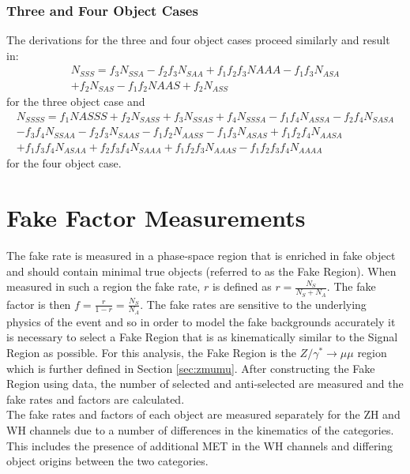 \subsubsection{Three and Four Object Cases}\label{sec:34_obj}
The derivations for the three and four object cases proceed similarly and result in:
\begin{multline*}
    N_{SSS}=f_3N_{SSA}-f_2f_3N_{SAA}+f_1f_2f_3N{AAA}-f_1f_3N_{ASA}\\
    +f_2N_{SAS}-f_1f_2N{AAS}+f_2N_{ASS}
\end{multline*}
\noindent for the three object case and 
\begin{multline*}
    N_{SSSS}=f_1N{ASSS}+f_2N_{SASS}+f_3N_{SSAS}+f_4N_{SSSA}-f_1f_4N_{ASSA}-f_2f_4N_{SASA}\\
    -f_3f_4N_{SSAA}-f_2f_3N_{SAAS}-f_1f_2N_{AASS}-f_1f_3N_{ASAS}+f_1f_2f_4N_{AASA}\\
    +f_1f_3f_4N_{ASAA}+f_2f_3f_4N_{SAAA}+f_1f_2f_3N_{AAAS}-f_1f_2f_3f_4N_{AAAA}
\end{multline*}
\noindent for the four object case.

\section{Fake Factor Measurements}\label{sec:measurements}
The fake rate is measured in a phase-space region that is enriched in fake object and should contain minimal true objects (referred to as the Fake Region). When measured in such a region the fake rate, $r$ is defined as $r=\frac{N_S}{N_S+N_A}$. The fake factor is then $f=\frac{r}{1-r}=\frac{N_S}{N_A}$. The fake rates are sensitive to the underlying physics of the event and so in order to model the fake backgrounds accurately it is necessary to select a Fake Region that is as kinematically similar to the Signal Region as possible. For this analysis, the Fake Region is the $Z/\gamma^*\rightarrow\mu\mu$ region which is further defined in Section \ref{sec:zmumu}. After constructing the Fake Region using data, the number of selected and anti-selected are measured and the fake rates and factors are calculated.\\

The fake rates and factors of each object are measured separately for the ZH and WH channels due to a number of differences in the kinematics of the categories. This includes the presence of additional MET in the WH channels and differing object origins between the two categories.

